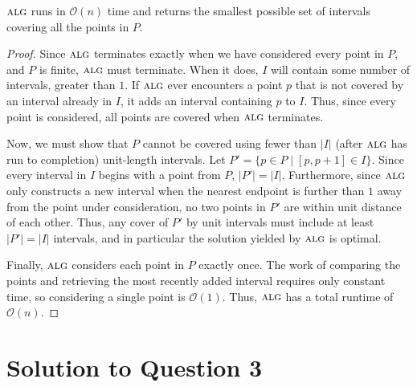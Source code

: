 \documentclass[11pt]{article}
\renewcommand{\O}{\mathcal{O}}
\newcommand{\alg}{\textsc{alg}}
\begin{document}
 $\alg$ runs in $\O(n)$ time and returns the smallest possible set of intervals covering all the points in $P$.
\begin{proof}
  Since $\alg$ terminates exactly when we have considered every point in $P$, and $P$ is finite, $\alg$ must terminate.
  When it does, $I$ will contain some number of intervals, greater than $1$.
  If $\alg$ ever encounters a point $p$ that is not covered by an interval already in $I$, it adds an interval containing $p$ to $I$.
  Thus, since every point is considered, all points are covered when $\alg$ terminates.

  Now, we must show that $P$ cannot be covered using fewer than $|I|$ (after $\alg$ has run to completion) unit-length intervals.
  Let $P' = \{p \in P \mid [p, p + 1] \in I\}$.
  Since every interval in $I$ begins with a point from $P$, $|P'| = |I|$.
  Furthermore, since $\alg$ only constructs a new interval when the nearest endpoint is further than $1$ away from the point under consideration, no two points in $P'$ are within unit distance of each other.
  Thus, any cover of $P'$ by unit intervals must include at least $|P'| = |I|$ intervals, and in particular the solution yielded by $\alg$ is optimal.

  Finally, $\alg$ considers each point in $P$ exactly once.
  The work of comparing the points and retrieving the most recently added interval requires only constant time, so considering a single point is $\O(1)$.
  Thus, $\alg$ has a total runtime of $\O(n)$.
\end{proof}




\section{Solution to Question 3}
\end{document}
